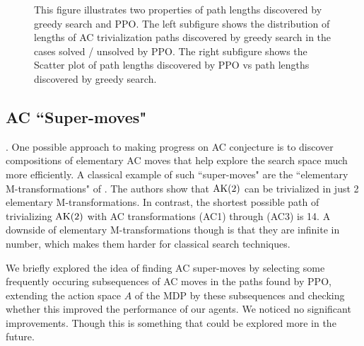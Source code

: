 \begin{figure}
\begin{subfigure}[b]{0.5\textwidth}
		\caption{}
		\label{fig:path_lengths_gs_vs_ppo}
	\end{subfigure}
	\caption{
This figure illustrates two properties of path lengths discovered by greedy search and PPO. The left subfigure shows the distribution of lengths of AC trivialization paths discovered by greedy search in the cases solved / unsolved by PPO. The right subfigure shows the Scatter plot of path lengths discovered by PPO vs path lengths discovered by greedy search.} \label{fig:path_lengths_gs_vs_ppo_full}
\end{figure}

\subsection{AC ``Super-moves"}.
One possible approach to making progress on AC conjecture is to discover compositions of elementary AC moves that help explore the search space much more efficiently. A classical example of such ``super-moves" are the ``elementary M-transformations" of \cite{BurnsI, BurnsII}.  The authors show that $\text{AK}(2)$ can be trivialized in just 2 elementary M-transformations. In contrast, the shortest possible path of trivializing $\text{AK}(2)$ with AC transformations (AC1) through (AC3) is 14. A downside of elementary M-transformations though is that they are infinite in number, which makes them harder for classical search techniques.
\newline 

We briefly explored the idea of finding AC super-moves by selecting some frequently occuring subsequences of AC moves in the paths found by PPO, extending the action space $A$ of the MDP by these subsequences and checking whether this improved the performance of our agents. We noticed no significant improvements. Though this is something that could be explored more in the future.